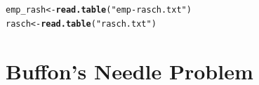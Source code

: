 \documentclass[letterpaper,12pt]{article}\usepackage[]{graphicx}\usepackage[]{color}
\makeatletter
\newcommand{\hlstr}[1]{\textcolor[rgb]{0.192,0.494,0.8}{#1}}%
\newcommand{\hlstd}[1]{\textcolor[rgb]{0.345,0.345,0.345}{#1}}%
\newcommand{\hlkwb}[1]{\textcolor[rgb]{0.69,0.353,0.396}{#1}}%
\newcommand{\hlkwd}[1]{\textcolor[rgb]{0.737,0.353,0.396}{\textbf{#1}}}%
\newenvironment{kframe}{%
 \def\at@end@of@kframe{}%
 \ifinner\ifhmode%
  \def\at@end@of@kframe{\end{minipage}}%
  \begin{minipage}{\columnwidth}%
 \fi\fi%
 \def\FrameCommand##1{\hskip\@totalleftmargin \hskip-\fboxsep
 \colorbox{shadecolor}{##1}\hskip-\fboxsep
     \hskip-\linewidth \hskip-\@totalleftmargin \hskip\columnwidth}%
 \MakeFramed {\advance\hsize-\width
   \@totalleftmargin\z@ \linewidth\hsize
   \@setminipage}}%
 {\par\unskip\endMakeFramed%
 \at@end@of@kframe}
\newenvironment{knitrout}{}{} %
\numberwithin{equation}{section}
\makeatother
\begin{document}
\begin{knitrout}
\color{fgcolor}\begin{kframe}
\begin{alltt}
\hlstd{emp_rash} \hlkwb{<-} \hlkwd{read.table}\hlstd{(}\hlstr{"emp-rasch.txt"}\hlstd{)}
\hlstd{rasch} \hlkwb{<-} \hlkwd{read.table}\hlstd{(}\hlstr{"rasch.txt"}\hlstd{)}
\end{alltt}
\end{kframe}
\end{knitrout}


\section{Buffon's Needle Problem}
\end{document}
